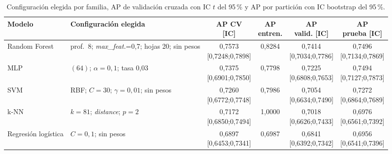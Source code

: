 \documentclass[journal]{IEEEtran}
\begin{document}
\begin{table}[t]
\centering
\caption{Configuración elegida por familia, AP de validación cruzada con IC $t$ del
95\,\% y AP por partición con IC bootstrap del 95\,\%.}
\label{tab:mejores}
\scriptsize
\renewcommand{\arraystretch}{1.06}
\setlength{\tabcolsep}{3pt}
\begin{tabular}{p{2.2cm} p{5.3cm} c c c c}
\toprule
\textbf{Modelo} & \textbf{Configuración elegida} & \makecell{\textbf{AP CV}\\\textbf{[IC]}} & \makecell{\textbf{AP}\\\textbf{entren.}} & \makecell{\textbf{AP}\\\textbf{valid. [IC]}} & \makecell{\textbf{AP}\\\textbf{prueba [IC]}} \\
\midrule
Random Forest & prof.\ 8; \textit{max\_feat.}=0{,}7; hojas 20; sin pesos & \makecell{0{,}7573\\{[0{,}7248;0{,}7898]}} & 0{,}8284 & \makecell{0{,}7414\\{[0{,}7034;0{,}7786]}} & \makecell{0{,}7496\\{[0{,}7134;0{,}7869]}} \\
MLP & $(64)$; $\alpha=0{,}1$; tasa 0{,}03 & \makecell{0{,}7375\\{[0{,}6901;0{,}7850]}} & 0{,}7798 & \makecell{0{,}7225\\{[0{,}6808;0{,}7653]}} & \makecell{0{,}7494\\{[0{,}7127;0{,}7873]}} \\
SVM & RBF; $C=30$; $\gamma=0{,}01$; sin pesos & \makecell{0{,}7260\\{[0{,}6772;0{,}7748]}} & 0{,}7986 & \makecell{0{,}7054\\{[0{,}6634;0{,}7490]}} & \makecell{0{,}7272\\{[0{,}6864;0{,}7689]}} \\
k-NN & $k=81$; \textit{distance}; $p=2$ & \makecell{0{,}7172\\{[0{,}6850;0{,}7494]}} & 1{,}0000 & \makecell{0{,}7018\\{[0{,}6626;0{,}7433]}} & \makecell{0{,}6976\\{[0{,}6561;0{,}7392]}} \\
Regresión logística & $C=0{,}1$; sin pesos & \makecell{0{,}6897\\{[0{,}6453;0{,}7341]}} & 0{,}6987 & \makecell{0{,}6841\\{[0{,}6392;0{,}7342]}} & \makecell{0{,}6956\\{[0{,}6541;0{,}7396]}} \\
\bottomrule
\end{tabular}
\end{table}
\end{document}
